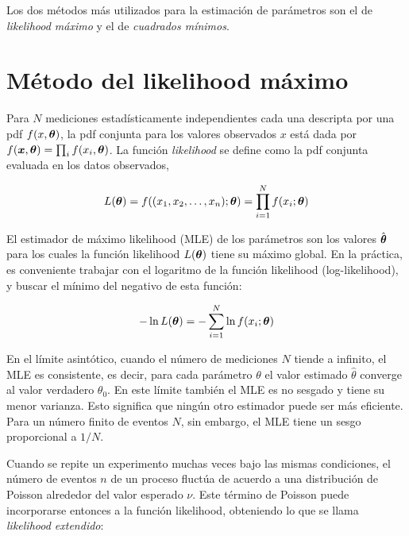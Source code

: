 Los dos métodos más utilizados para la estimación de parámetros son el de
\emph{likelihood máximo} y el de \emph{cuadrados mínimos}.


\section{Método del likelihood máximo}\label{sec:MLE}

Para $N$ mediciones estadísticamente independientes cada una descripta por una
pdf $f(x, \bm{\theta})$, la pdf conjunta para los valores observados $x$ está dada
por $f(\bm{x}, \bm{\theta}) = \prod_i f(x_i, \bm{\theta})$. La función \emph{likelihood}
se define como la pdf conjunta evaluada en los datos observados,

\begin{equation}
  L(\bm{\theta}) = f((x_1, x_2, \ldots, x_n); \bm{\theta}) = \prod_{i=1}^{N} f(x_i;
  \bm{\theta})
\end{equation}

El estimador de máximo likelihood (MLE) de los parámetros {\btheta} son los
valores $\hat{\bm{\theta}}$ para los cuales la función likelihood $L(\bm{\theta})$ tiene
su máximo global. %
En la práctica, es conveniente trabajar con el logaritmo de la función
likelihood (log-likelihood), y buscar el mínimo del negativo de esta función:

\begin{equation}
  - \ln L(\bm{\theta}) = - \sum_{i=1}^{N} \ln f(x_i; \bm{\theta})
\end{equation}

En el límite asintótico, cuando el número de mediciones $N$ tiende a infinito,
el MLE es consistente, es decir, para cada parámetro $\theta$ el valor estimado
$\hat{\theta}$ converge al valor verdadero $\theta_0$. En este límite también el
MLE es no sesgado y tiene su menor varianza. Esto significa que ningún otro
estimador puede ser más eficiente. Para un número finito de eventos $N$, sin
embargo, el MLE tiene un sesgo proporcional a $1/N$.


Cuando se repite un experimento muchas veces bajo las mismas condiciones, el
número de eventos $n$ de un proceso fluctúa de acuerdo a una distribución
de Poisson alrededor del valor esperado $\nu$. Este término de Poisson puede
incorporarse entonces a la función likelihood, obteniendo lo que se llama
\emph{likelihood extendido}:

